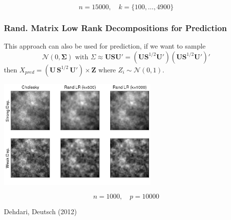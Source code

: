 \documentclass[t]{beamer}\usepackage[]{graphicx}\usepackage[]{color}
\newenvironment{knitrout}{}{} %
\begin{document}
\begin{frame}
{\begin{center}
\begin{knitrout}
{}



\end{knitrout}
\end{center}
}

\vspace{-10mm}
\[ n = 15000,\quad k=\{100,\ldots,4900\} \]

\end{frame}



\begin{frame}
\frametitle{Rand. Matrix Low Rank Decompositions for Prediction}

\vspace{-3mm}

This approach can also be used for prediction, if we want to sample 
\[ \mathcal{N}(0,\bm{\Sigma}) \text{ with }\Sigma \approx \bm{U} \bm{S} \bm{U}' = (\bm{U} \bm{S}^{1/2} \bm{U}')(\bm{U} \bm{S}^{1/2} \bm{U}')'\] 
then $X_{pred} = (\bm{U}\, \bm{S}^{1/2}\,\bm{U}') \times \bm{Z}$ where $Z_i \sim \mathcal{N}(0,1)$.

\pause

\begin{center}
\includegraphics[width=0.6\textwidth]{figs/RandLRPred.png}
\end{center}

\vspace{-10mm}

\[ n=1000, \quad p=10000 \]

\begin{center}
{\footnotesize
Dehdari, Deutsch (2012)
}
\end{center}

\end{frame}

\end{document}
